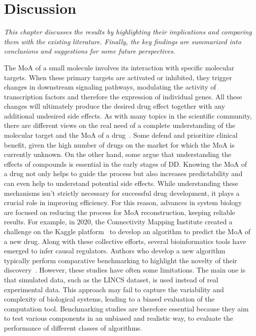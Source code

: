 ﻿%

%


\chapter{Discussion}
\label{cha:discussion}


\textit{This chapter discusses the results by highlighting their implications and comparing them with the existing literature. Finally, the key findings are summarized into conclusions and suggestions for some future perspectives.}

The MoA of a small molecule involves its interaction with specific molecular targets. When these primary targets are activated or inhibited, they trigger changes in downstream signaling pathways, modulating the activity of transcription factors and therefore the expression of individual genes. All these changes will ultimately produce the desired drug effect together with any additional undesired side effects. As with many topics in the scientific community, there are different views on the real need of a complete understanding of the molecular target and the MoA of a drug~\cite{RN112}. Some defend and prioritize clinical benefit, given the high number of drugs on the market for which the MoA is currently unknown. On the other hand, some argue that understanding the effects of compounds is essential in the early stages of DD. Knowing the MoA of a drug not only helps to guide the process but also increases predictability and can even help to understand potential side effects. While understanding these mechanisms isn't strictly necessary for successful drug development, it plays a crucial role in improving efficiency. For this reason, advances in system biology are focused on reducing the process for MoA reconstruction, keeping reliable results. For example, in 2020, the Connectivity Mapping Institute created a challenge on the Kaggle platform~\cite{RN162} to develop an algorithm to predict the MoA of a new drug. Along with these collective efforts, several bioinformatics tools have emerged to infer causal regulators. Authors who develop a new algorithm typically perform comparative benchmarking to highlight the novelty of their discovery~\cite{RN109}. However, these studies have often some limitations. The main one is that simulated data, such as the LINCS dataset, is used instead of real experimental data. This approach may fail to capture the variability and complexity of biological systems, leading to a biased evaluation of the computation tool. Benchmarking studies are therefore essential because they aim to test various components in an unbiased and realistic way, to evaluate the performance of different classes of algorithms. 

